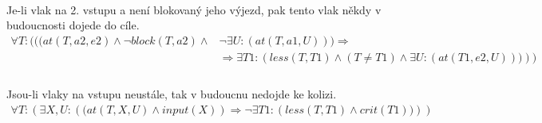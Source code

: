 \documentclass[a4paper,journal]{IEEEtran}
\begin{document}
\paragraph*{}Je-li vlak na 2. vstupu a není blokovaný jeho výjezd, pak tento vlak někdy v budoucnosti dojede do cíle.
\begin{equation}
\begin{split}
\forall T:(((at\left(T,a2,e2\right) \wedge \neg block\left(T,a2\right) \wedge &\neg \exists U:\left(at\left(T,a1,U\right)\right)) \Rightarrow \\
&\Rightarrow\exists T1:\left(less\left(T,T1\right) \wedge (T \neq T1) \wedge \exists U:\left(at\left(T1,e2,U\right)\right))\right))\\
\end{split}
\end{equation}
\paragraph*{}Jsou-li vlaky na vstupu neustále, tak v budoucnu nedojde ke kolizi.
\begin{equation}
\begin{split}
\forall T:\left(\exists X,U:\left((at\left(T,X,U\right) \wedge input\left(X\right)\right) \Rightarrow 
\neg\exists T1:\left(less\left(T,T1\right) \wedge crit\left(T1\right))\right)\right)
\end{split}
\end{equation}


\end{document}
